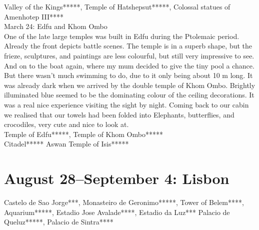 Valley of the Kings*****, Temple of Hatshepsut*****, Colossal statues of Amenhotep III****\\

March 24: Edfu and Khom Ombo\\
One of the late large temples was built in Edfu during the Ptolemaic period. Already the front depicts battle scenes. The temple is in a superb shape, but the frieze, sculptures, and paintings are less colourful, but still very impressive to see. And on to the boat again, where my mum decided to give the tiny pool a chance. But there wasn't much swimming to do, due to it only being about 10 m long. It was already dark when we arrived by
 the double temple of Khom Ombo. Brightly illuminated blue seemed to be the dominating colour of the ceiling decorations. It was a real nice experience visiting the sight by night. Coming back to our cabin we realised that our towels had been folded into Elephants, butterflies, and crocodiles, very cute and nice to look at.\\
 
 Temple of Edfu*****, Temple of Khom Ombo*****\\
 


Citadel*****
Aswan Temple of Isis*****

\section{August 28--September 4: Lisbon}
\label{2005:lisbon}


Castelo de Sao Jorge***, Monasteiro de Geronimo*****, Tower of Belem****, Aquarium*****, Estadio Jose Avalade****, Estadio da Luz***
Palacio de Queluz*****, Palacio de Sintra****
